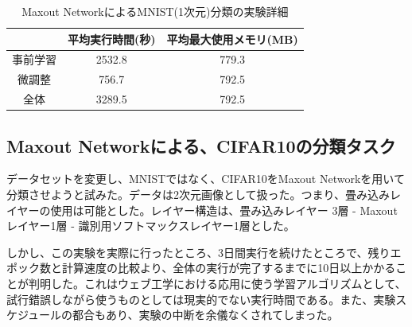 \begin{table}[tdp]
\caption{Maxout NetworkによるMNIST(1次元)分類の実験詳細}
\begin{center}
\begin{tabular}{|c|c|c|}\hline
 & 平均実行時間(秒) & 平均最大使用メモリ(MB) \\ \hline
事前学習 & 2532.8 & 779.3 \\ \hline
微調整 & 756.7 & 792.5 \\ \hline
全体 & 3289.5 & 792.5 \\ \hline
\end{tabular}
\end{center}
\label{c5_maxout_mnist1_stat}
\end{table}%


\subsection{Maxout Networkによる、CIFAR10の分類タスク}
データセットを変更し、MNISTではなく、CIFAR10をMaxout Networkを用いて分類させようと試みた。データは2次元画像として扱った。つまり、畳み込みレイヤーの使用は可能とした。レイヤー構造は、畳み込みレイヤー 3層 - Maxout レイヤー1層 - 識別用ソフトマックスレイヤー1層とした。\par
しかし、この実験を実際に行ったところ、3日間実行を続けたところで、残りエポック数と計算速度の比較より、全体の実行が完了するまでに10日以上かかることが判明した。これはウェブ工学における応用に使う学習アルゴリズムとして、試行錯誤しながら使うものとしては現実的でない実行時間である。また、実験スケジュールの都合もあり、実験の中断を余儀なくされてしまった。%